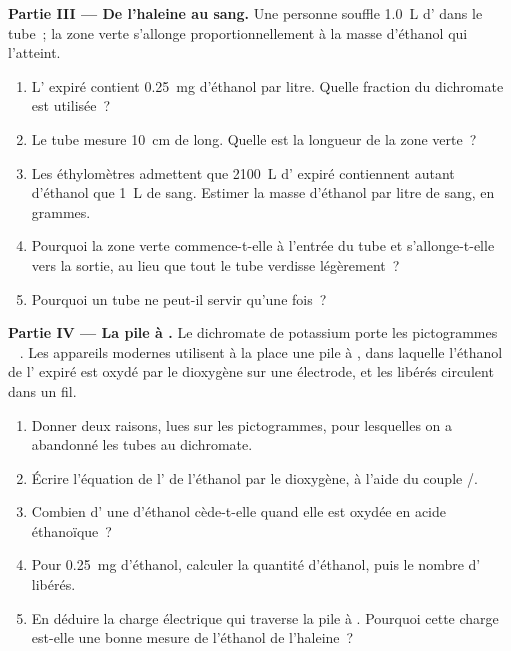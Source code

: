\begin{problem}
\medskip
\noindent\textbf{Partie III --- De l'haleine au sang.}
Une personne souffle \qty{1.0}{L} d' dans le tube~; la zone verte
s'allonge proportionnellement à la masse d'éthanol qui l'atteint.
\begin{enumerate}[resume]
  \item L' expiré contient \qty{0.25}{mg} d'éthanol par litre. Quelle
        fraction du dichromate est utilisée~?
  \item Le tube mesure \qty{10}{cm} de long. Quelle est la longueur de la
        zone verte~?
  \item Les éthylomètres admettent que \qty{2100}{L} d' expiré
        contiennent autant d'éthanol que \qty{1}{L} de sang. Estimer la
        masse d'éthanol par litre de sang, en grammes.
  \item Pourquoi la zone verte commence-t-elle à l'entrée du tube et
        s'allonge-t-elle vers la sortie, au lieu que tout le tube verdisse
        légèrement~?
  \item Pourquoi un tube ne peut-il servir qu'une fois~?
\end{enumerate}

\medskip
\noindent\textbf{Partie IV --- La pile à .}
Le dichromate de potassium porte les pictogrammes
\,\,\,\,\,.
Les appareils modernes utilisent à la place une pile à , dans
laquelle l'éthanol de l' expiré est oxydé par le dioxygène sur une
électrode, et les  libérés circulent dans un fil.
\begin{enumerate}[resume]
  \item Donner deux raisons, lues sur les pictogrammes, pour lesquelles
        on a abandonné les tubes au dichromate.
  \item Écrire l'équation de l' de l'éthanol par le dioxygène,
        à l'aide du couple /.
  \item Combien d' une  d'éthanol cède-t-elle quand
        elle est oxydée en acide éthanoïque~?
  \item Pour \qty{0.25}{mg} d'éthanol, calculer la quantité d'éthanol,
        puis le nombre d' libérés.
  \item En déduire la charge électrique qui traverse la pile à
        . Pourquoi cette charge est-elle une bonne mesure de
        l'éthanol de l'haleine~?
\end{enumerate}
\end{problem}
